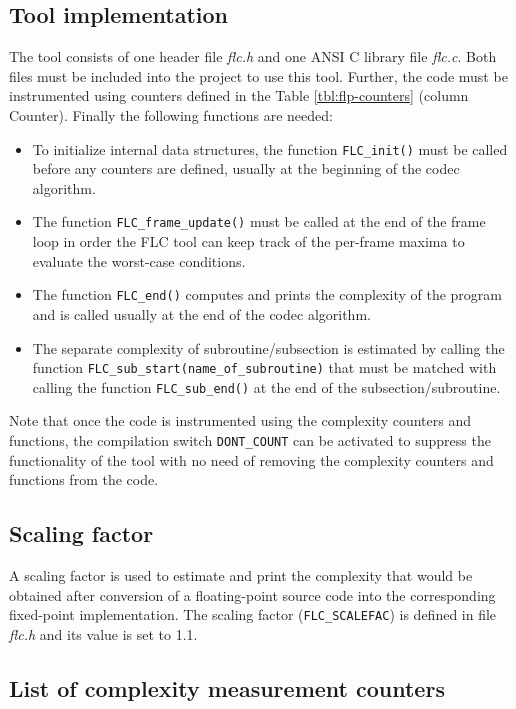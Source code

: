 \subsection{Tool implementation}
The tool consists of one header file \textit{flc.h} and one ANSI C library
file \textit{flc.c}. Both files must be included into the project to use
this tool. Further, the code must be instrumented using counters defined
in the Table \ref{tbl:flp-counters} (column Counter). Finally the following
functions are needed:
\begin{itemize}
\item To initialize internal data structures, the function
{\tt FLC\_init()} must be called before any counters are defined,
usually at the beginning of the codec algorithm.
\item The function {\tt FLC\_frame\_update()} must be called at the
end of the frame loop in order the FLC tool can keep track of the
per-frame maxima to evaluate the worst-case conditions.
\item The function {\tt FLC\_end()} computes and prints the complexity
of the program and is called usually at the end of the codec algorithm.
\item The separate complexity of subroutine/subsection is estimated by
calling the function {\tt FLC\_sub\_start(name\_of\_subroutine)} that
must be matched with calling the function {\tt FLC\_sub\_end()} at
the end of the subsection/subroutine.
\end{itemize}

Note that once the code is instrumented using the complexity counters
and functions, the compilation switch {\tt DONT\_COUNT} can be
activated to suppress the functionality of the tool with no need of
removing the complexity counters and functions from the code.

\subsection{Scaling factor}
A scaling factor is used to estimate and print the complexity that
would be obtained after conversion of a floating-point source code
into the corresponding fixed-point implementation. The scaling factor
({\tt FLC\_SCALEFAC}) is defined in file \textit{flc.h} and its value
is set to 1.1.

\subsection{List of complexity measurement counters}

